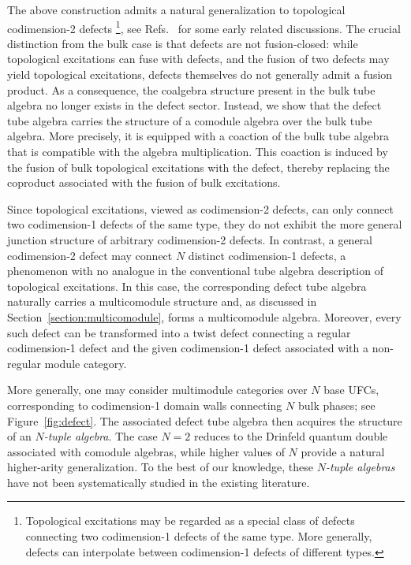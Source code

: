 \documentclass[a4paper,11pt]{article}
\theoremstyle{definition}
\theoremstyle{remark}
\begin{document}
The above construction admits a natural generalization to topological codimension-2 defects \footnote{Topological excitations may be regarded as a special class of defects connecting two codimension-1 defects of the same type. More generally, defects can interpolate between codimension-1 defects of different types.}, see Refs.~\cite{Kitaev2012boundary,kong2012universal,williamson2017SETtube,morrison2012blob} for some early related discussions. The crucial distinction from the bulk case is that defects are not fusion-closed: while topological excitations can fuse with defects, and the fusion of two defects may yield topological excitations, defects themselves do not generally admit a fusion product. As a consequence, the coalgebra structure present in the bulk tube algebra no longer exists in the defect sector. Instead, we show that the defect tube algebra carries the structure of a comodule algebra over the bulk tube algebra. More precisely, it is equipped with a coaction of the bulk tube algebra that is compatible with the algebra multiplication. This coaction is induced by the fusion of bulk topological excitations with the defect, thereby replacing the coproduct associated with the fusion of bulk excitations.


Since topological excitations, viewed as codimension-2 defects, can only connect two codimension-1 defects of the same type, they do not exhibit the more general junction structure of arbitrary codimension-2 defects. In contrast, a general codimension-2 defect may connect $N$ distinct codimension-1 defects, a phenomenon with no analogue in the conventional tube algebra description of topological excitations. In this case, the corresponding defect tube algebra naturally carries a multicomodule structure and, as discussed in Section~\ref{section:multicomodule}, forms a multicomodule algebra. Moreover, every such defect can be transformed into a twist defect connecting a regular codimension-1 defect and the given codimension-1 defect associated with a non-regular module category.

More generally, one may consider multimodule categories over $N$ base UFCs, corresponding to codimension-1 domain walls connecting $N$ bulk phases; see Figure~\ref{fig:defect}. The associated defect tube algebra then acquires the structure of an \emph{$N$-tuple algebra}. The case $N=2$ reduces to the Drinfeld quantum double associated with comodule algebras, while higher values of $N$ provide a natural higher-arity generalization. To the best of our knowledge, these \emph{$N$-tuple algebras} have not been systematically studied in the existing literature. 
\end{document}
